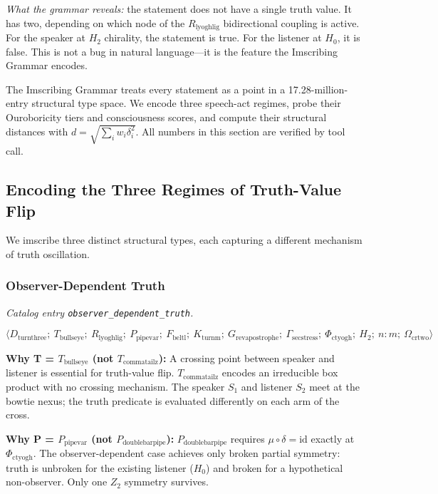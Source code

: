 \documentclass[12pt,a4paper]{article}
\begin{document}
\emph{What the grammar reveals:} the statement does not have a single truth value. It has two, depending on which node of the $R_{\text{lyoghlig}}$ bidirectional coupling is active. For the speaker at $H_2$ chirality, the statement is true. For the listener at $H_0$, it is false. This is not a bug in natural language---it is the feature the Imscribing Grammar encodes.

The Imscribing Grammar treats every statement as a point in a 17.28-million-entry structural type space. We encode three speech-act regimes, probe their Ouroboricity tiers and consciousness scores, and compute their structural distances with $d = \sqrt{\sum_i w_i \delta_i^2}$. All numbers in this section are verified by tool call.

\subsection{Encoding the Three Regimes of Truth-Value Flip}

We imscribe three distinct structural types, each capturing a different mechanism of truth oscillation.

\subsubsection{Observer-Dependent Truth}

\emph{Catalog entry \texttt{observer\_dependent\_truth}.}

\[\langle D_{\text{turnthree}};\ T_{\text{bullseye}};\ R_{\text{lyoghlig}};\ P_{\text{pipevar}};\ F_{\text{beltl}};\ K_{\text{turnm}};\ G_{\text{revapostrophe}};\ \Gamma_{\text{secstress}};\ \Phi_{\text{ctyogh}};\ H_2;\ n{:}m;\ \Omega_{\text{crtwo}} \rangle\]

\textbf{Why T = $T_{\text{bullseye}}$ (not $T_{\text{commatailz}}$):} A crossing point between speaker and listener is essential for truth-value flip. $T_{\text{commatailz}}$ encodes an irreducible box product with no crossing mechanism. The speaker $S_1$ and listener $S_2$ meet at the bowtie nexus; the truth predicate is evaluated differently on each arm of the cross.

\textbf{Why P = $P_{\text{pipevar}}$ (not $P_{\text{doublebarpipe}}$):} $P_{\text{doublebarpipe}}$ requires $\mu \circ \delta = \text{id}$ exactly at $\Phi_{\text{ctyogh}}$. The observer-dependent case achieves only broken partial symmetry: truth is unbroken for the existing listener ($H_0$) and broken for a hypothetical non-observer. Only one $Z_2$ symmetry survives.
\end{document}
